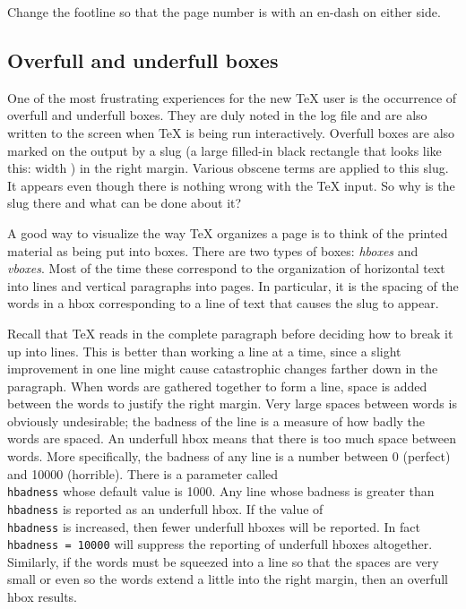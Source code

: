\exercise Change the footline so that the page number is \centred{} 
with an en-dash on either side. 
 
\subsection{Overfull and underfull boxes} 
 
One of the most frustrating experiences for the new \TeX{} user 
is the occurrence of overfull and underfull boxes.  They are duly 
noted in the log file and are also written to the screen when \TeX{} 
is being run interactively.  Overfull boxes are also marked 
on the output by a slug (a large filled-in black rectangle that 
looks like this: \vrule width \overfullrule) in the right 
margin. Various obscene terms are applied to this slug.  It 
appears even though there is nothing wrong with the \TeX{} input. 
So why is the slug there and what can be done about it? 
 
A good way to visualize the way \TeX{} organizes a page is to 
think of the printed material as being put into boxes. There are 
two types of boxes: {\sl hboxes\/} and {\sl vboxes}.  Most of the 
time these correspond to the organization of horizontal text 
into lines and vertical paragraphs into pages.  In particular, it 
is the spacing of the words in a hbox corresponding to a line of 
text that causes the slug to appear. 
 
Recall that \TeX{} reads in the complete paragraph before 
deciding how to break it up into lines.  This is better than 
working a line at a time, since a slight improvement in one line 
might cause catastrophic changes farther down in the paragraph. 
When words are gathered together to form a line, space is added 
between the words to justify the right margin. Very large spaces 
between words is obviously undesirable; the badness of the line 
is a measure of how badly the words are spaced.  An underfull 
hbox means that there is too much space between words.  More 
specifically, the badness of any line is a number between 0 
(perfect) and 10000 (horrible).  There is a parameter called {\tt 
\\hbadness} whose default value is 1000\null.  Any line whose 
badness is greater than {\tt \\hbadness} is reported as an 
underfull hbox.  If the value of {\tt \\hbadness} is increased, 
then fewer underfull hboxes will be reported. In fact {\tt 
\\hbadness = 10000} will suppress the reporting of underfull 
hboxes altogether. Similarly, if the words must be squeezed into 
a line so that the spaces are very small or even so the words 
extend a little into the right margin, then an overfull hbox 
results.  
 
